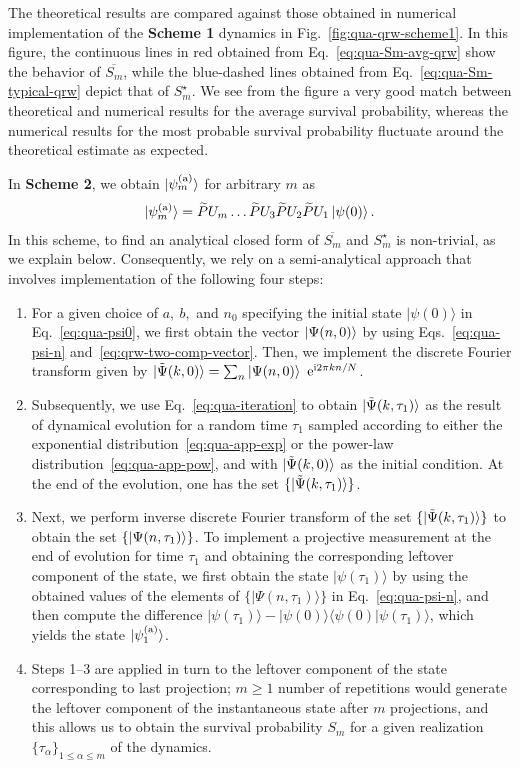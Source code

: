 \documentclass[12pt]{iopart}
\def\la{\langle}
\def\ra{\rangle}
\def\i{\ket{\psi (0)}}
\def\ket#1{\mathinner{|{#1}\rangle}}
\newcommand{\ee}{\mathrm{e}}
\newcommand{\ii}{\mathrm{i}}
\begin{document}
The theoretical results are compared against those obtained in 
numerical implementation of the \textbf{Scheme 1} dynamics in
Fig.~\ref{fig:qua-qrw-scheme1}. In this figure, the continuous lines in
red obtained from Eq.~\eqref{eq:qua-Sm-avg-qrw} show the behavior of
$\overline{S_m}$, while the blue-dashed lines obtained from Eq.~\eqref{eq:qua-Sm-typical-qrw} depict that of $S^{\star}_m$. 
We see from the figure a very good match between theoretical and numerical results for the average survival probability, whereas the numerical results for the most probable survival probability  fluctuate around the theoretical estimate as expected.

In \textbf{Scheme 2}, we obtain $\ket{\psi_m^{({\rm a})}}$ for arbitrary $m$ as
\begin{align}
        \ket{\psi_m^{({\rm a})}}=\widetilde{P} U_m \ldots  \widetilde{P} U_3 \widetilde{P} U_2 \widetilde{P} U_1\i.
\label{eq:qua-psim-definition-2}
\end{align}
In this scheme, to find an analytical closed form of $\overline{S_m}$
and $S_m^\star$ is
non-trivial, as we explain below. Consequently, we rely on a semi-analytical approach that involves implementation of the following four steps:
\begin{enumerate}
        \item For a given choice of $a,~b,$ and $n_0$ specifying the initial
state $|\psi(0)\rangle$ in Eq.~\eqref{eq:qua-psi0}, we first obtain the vector $\ket{\Psi(n,0)}$ by using Eqs.~\eqref{eq:qua-psi-n} and~\eqref{eq:qrw-two-comp-vector}. Then, we implement the discrete Fourier transform given by 
$\ket{\tilde\Psi(k,0)} =
\sum_{n}
\ket{\Psi(n,0)} ~ \ee^{\ii 2\pi kn/N} $.
\item Subsequently, we use Eq.~\eqref{eq:qua-iteration} to obtain 
$\ket{\tilde\Psi(k,\tau_1)}$ as the result of dynamical evolution for a random time $\tau_1$ sampled
according to either the exponential
distribution~\eqref{eq:qua-app-exp} or the power-law
distribution~\eqref{eq:qua-app-pow}, and with $\ket{\tilde\Psi(k,0)}$ as
                the initial condition. At the end of the evolution, one has
the set $\{\ket{\tilde\Psi(k,\tau_1)}\}$.
\item Next, we perform inverse discrete Fourier transform of the set
$\{\ket{\tilde\Psi(k,\tau_1)}\}$ to obtain the set $\{\ket{\Psi(n,\tau_1)}\}$. To
implement a projective measurement at the end of evolution for time
$\tau_1$ and obtaining the corresponding leftover component of the state, we first
obtain the state $|\psi(\tau_1)\ra$ by using the obtained values of
the elements of $\{|\Psi(n,\tau_1)\ra \}$ in
Eq.~\eqref{eq:qua-psi-n}, and then compute the
                difference $|\psi(\tau_1)\ra-|\psi(0)\ra\la
                \psi(0)|\psi(\tau_1)\ra$, which yields the state
                $|\psi_1^{({\rm a})}\ra$. 
\item Steps 1--3 are applied in turn to the leftover component of the 
state corresponding to last projection; $m \ge 1$ number of repetitions would 
generate the leftover component of the instantaneous state after $m$ projections, and this allows us
to obtain the survival probability $S_m$ for a given realization
$\{\tau_\alpha\}_{1\le \alpha \le m}$ of the dynamics.
\end{enumerate}
\end{document}
